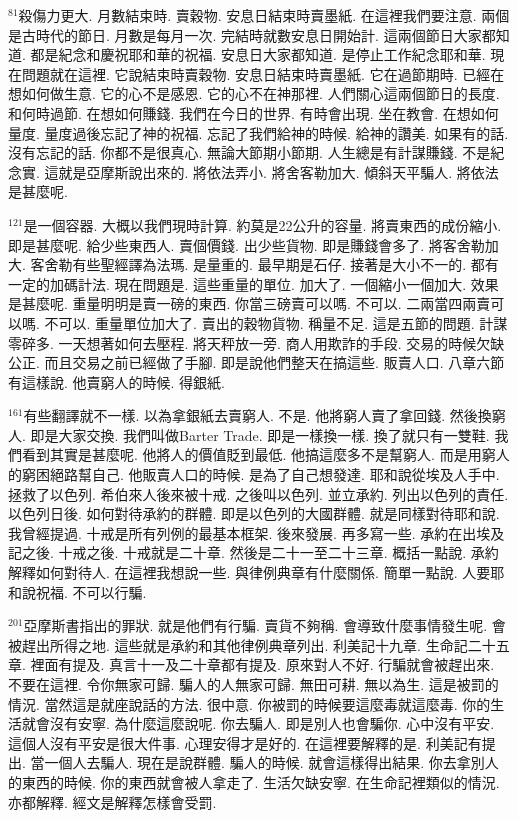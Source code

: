 \documentclass{book}
\begin{document}
$^{81}$殺傷力更大.
月數結束時.
賣穀物.
安息日結束時賣墨紙.
在這裡我們要注意.
兩個是古時代的節日.
月數是每月一次.
完結時就數安息日開始計.
這兩個節日大家都知道.
都是紀念和慶祝耶和華的祝福.
安息日大家都知道.
是停止工作紀念耶和華.
現在問題就在這裡.
它說結束時賣穀物.
安息日結束時賣墨紙.
它在過節期時.
已經在想如何做生意.
它的心不是感恩.
它的心不在神那裡.
人們關心這兩個節日的長度.
和何時過節.
在想如何賺錢.
我們在今日的世界.
有時會出現.
坐在教會.
在想如何量度.
量度過後忘記了神的祝福.
忘記了我們給神的時候.
給神的讚美.
如果有的話.
沒有忘記的話.
你都不是很真心.
無論大節期小節期.
人生總是有計謀賺錢.
不是紀念實.
這就是亞摩斯說出來的.
將依法弄小.
將舍客勒加大.
傾斜天平騙人.
將依法是甚麼呢.

$^{121}$是一個容器.
大概以我們現時計算.
約莫是22公升的容量.
將賣東西的成份縮小.
即是甚麼呢.
給少些東西人.
賣個價錢.
出少些貨物.
即是賺錢會多了.
將客舍勒加大.
客舍勒有些聖經譯為法瑪.
是量重的.
最早期是石仔.
接著是大小不一的.
都有一定的加碼計法.
現在問題是.
這些重量的單位.
加大了.
一個縮小一個加大.
效果是甚麼呢.
重量明明是賣一磅的東西.
你當三磅賣可以嗎.
不可以.
二兩當四兩賣可以嗎.
不可以.
重量單位加大了.
賣出的穀物貨物.
稱量不足.
這是五節的問題.
計謀零碎多.
一天想著如何去壓程.
將天秤放一旁.
商人用欺詐的手段.
交易的時候欠缺公正.
而且交易之前已經做了手腳.
即是說他們整天在搞這些.
販賣人口.
八章六節有這樣說.
他賣窮人的時候.
得銀紙.

$^{161}$有些翻譯就不一樣.
以為拿銀紙去賣窮人.
不是.
他將窮人賣了拿回錢.
然後換窮人.
即是大家交換.
我們叫做Barter Trade.
即是一樣換一樣.
換了就只有一雙鞋.
我們看到其實是甚麼呢.
他將人的價值貶到最低.
他搞這麼多不是幫窮人.
而是用窮人的窮困絕路幫自己.
他販賣人口的時候.
是為了自己想發達.
耶和說從埃及人手中.
拯救了以色列.
希伯來人後來被十戒.
之後叫以色列.
並立承約.
列出以色列的責任.
以色列日後.
如何對待承約的群體.
即是以色列的大國群體.
就是同樣對待耶和說.
我曾經提過.
十戒是所有列例的最基本框架.
後來發展.
再多寫一些.
承約在出埃及記之後.
十戒之後.
十戒就是二十章.
然後是二十一至二十三章.
概括一點說.
承約解釋如何對待人.
在這裡我想說一些.
與律例典章有什麼關係.
簡單一點說.
人要耶和說祝福.
不可以行騙.

$^{201}$亞摩斯書指出的罪狀.
就是他們有行騙.
賣貨不夠稱.
會導致什麼事情發生呢.
會被趕出所得之地.
這些就是承約和其他律例典章列出.
利美記十九章.
生命記二十五章.
裡面有提及.
真言十一及二十章都有提及.
原來對人不好.
行騙就會被趕出來.
不要在這裡.
令你無家可歸.
騙人的人無家可歸.
無田可耕.
無以為生.
這是被罰的情況.
當然這是就座說話的方法.
很中意.
你被罰的時候要這麼毒就這麼毒.
你的生活就會沒有安寧.
為什麼這麼說呢.
你去騙人.
即是別人也會騙你.
心中沒有平安.
這個人沒有平安是很大件事.
心理安得才是好的.
在這裡要解釋的是.
利美記有提出.
當一個人去騙人.
現在是說群體.
騙人的時候.
就會這樣得出結果.
你去拿別人的東西的時候.
你的東西就會被人拿走了.
生活欠缺安寧.
在生命記裡類似的情況.
亦都解釋.
經文是解釋怎樣會受罰.
\end{document}
